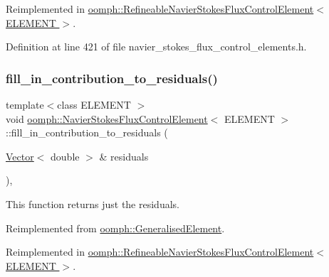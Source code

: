Reimplemented in \hyperlink{classoomph_1_1RefineableNavierStokesFluxControlElement_a46659967091dc0f672d91f2ac339c304}{oomph\+::\+Refineable\+Navier\+Stokes\+Flux\+Control\+Element$<$ E\+L\+E\+M\+E\+N\+T $>$}.



Definition at line 421 of file navier\+\_\+stokes\+\_\+flux\+\_\+control\+\_\+elements.\+h.

\mbox{\label{classoomph_1_1NavierStokesFluxControlElement_ad612e8f706ba627f11dd380cc20bfab2}} 
\subsubsection{\texorpdfstring{fill\+\_\+in\+\_\+contribution\+\_\+to\+\_\+residuals()}{fill\_in\_contribution\_to\_residuals()}}
{\footnotesize\ttfamily template$<$class E\+L\+E\+M\+E\+NT $>$ \\
void \hyperlink{classoomph_1_1NavierStokesFluxControlElement}{oomph\+::\+Navier\+Stokes\+Flux\+Control\+Element}$<$ E\+L\+E\+M\+E\+NT $>$\+::fill\+\_\+in\+\_\+contribution\+\_\+to\+\_\+residuals (\begin{DoxyParamCaption}\item[{\hyperlink{classoomph_1_1Vector}{Vector}$<$ double $>$ \&}]{residuals }\end{DoxyParamCaption})\hspace{0.3cm}{\ttfamily [inline]}, {\ttfamily [virtual]}}



This function returns just the residuals. 



Reimplemented from \hyperlink{classoomph_1_1GeneralisedElement_a310c97f515e8504a48179c0e72c550d7}{oomph\+::\+Generalised\+Element}.



Reimplemented in \hyperlink{classoomph_1_1RefineableNavierStokesFluxControlElement_ad1b969e5a71a212e297ece3a07b9f5cb}{oomph\+::\+Refineable\+Navier\+Stokes\+Flux\+Control\+Element$<$ E\+L\+E\+M\+E\+N\+T $>$}.



